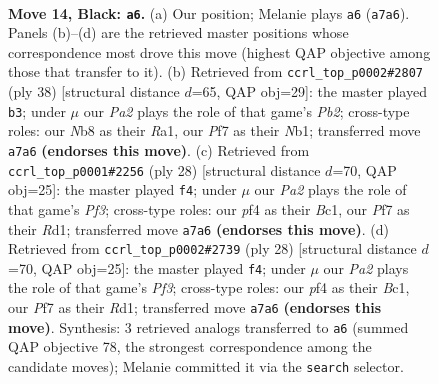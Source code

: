\documentclass[11pt]{article}
\begin{document}
\clearpage

\begin{figure}[p]\centering
\begin{subfigure}{0.46\textwidth}\centering
\resizebox{\linewidth}{!}{%
\newchessgame
\chessboard[
  setfen={rn3r2/ppp1bppk/7p/4P3/P1p2PbP/2N1P3/1P1N4/R3KB1R b KQ - 0 14},
  showmover=false,
  pgfstyle=straightmove, color=movearrow, markmove={a7-a6}
]}
\caption{}
\end{subfigure}\hfill
\begin{subfigure}{0.46\textwidth}\centering
\resizebox{\linewidth}{!}{%
\newchessgame
\chessboard[
  setfen={r1bk1r2/p1p4p/1npp2p1/8/2P5/8/PP2BPPP/RN2R1K1 w - - 2 20},
  showmover=false,
  pgfstyle=straightmove, color=movearrow, markmove={b2-b3}
]}
\caption{}
\end{subfigure}
\\[4pt]
\begin{subfigure}{0.46\textwidth}\centering
\resizebox{\linewidth}{!}{%
\newchessgame
\chessboard[
  setfen={r3k2r/ppp1bppp/2p3n1/P3P3/R7/2N2P2/1PP2P1P/2BR2K1 w - - 1 15},
  showmover=false,
  pgfstyle=straightmove, color=movearrow, markmove={f3-f4}
]}
\caption{}
\end{subfigure}\hfill
\begin{subfigure}{0.46\textwidth}\centering
\resizebox{\linewidth}{!}{%
\newchessgame
\chessboard[
  setfen={r3k2r/ppp1bppp/2p3n1/P3P3/R7/2N2P2/1PP2P1P/2BR2K1 w - - 1 15},
  showmover=false,
  pgfstyle=straightmove, color=movearrow, markmove={f3-f4}
]}
\caption{}
\end{subfigure}
\caption{\textbf{Move 14, Black: \texttt{a6}.} (a) Our position; Melanie plays \texttt{a6} (\texttt{a7a6}). Panels (b)--(d) are the retrieved master positions whose correspondence most drove this move (highest QAP objective among those that transfer to it). (b) Retrieved from \texttt{ccrl\_top\_p0002\#2807} (ply 38) [structural distance $d$=65, QAP obj=29]: the master played \texttt{b3}; under $\mu$ our \emph{Pa2} plays the role of that game's \emph{Pb2}; cross-type roles: our \emph{N}b8 as their \emph{R}a1, our \emph{P}f7 as their \emph{N}b1; transferred move \texttt{a7a6} \textbf{(endorses this move)}. (c) Retrieved from \texttt{ccrl\_top\_p0001\#2256} (ply 28) [structural distance $d$=70, QAP obj=25]: the master played \texttt{f4}; under $\mu$ our \emph{Pa2} plays the role of that game's \emph{Pf3}; cross-type roles: our \emph{p}f4 as their \emph{B}c1, our \emph{P}f7 as their \emph{R}d1; transferred move \texttt{a7a6} \textbf{(endorses this move)}. (d) Retrieved from \texttt{ccrl\_top\_p0002\#2739} (ply 28) [structural distance $d$=70, QAP obj=25]: the master played \texttt{f4}; under $\mu$ our \emph{Pa2} plays the role of that game's \emph{Pf3}; cross-type roles: our \emph{p}f4 as their \emph{B}c1, our \emph{P}f7 as their \emph{R}d1; transferred move \texttt{a7a6} \textbf{(endorses this move)}. Synthesis: 3 retrieved analogs transferred to \texttt{a6} (summed QAP objective 78, the strongest correspondence among the candidate moves); Melanie committed it via the \texttt{search} selector.}
\label{fig:thought-m27}
\end{figure}
\end{document}
